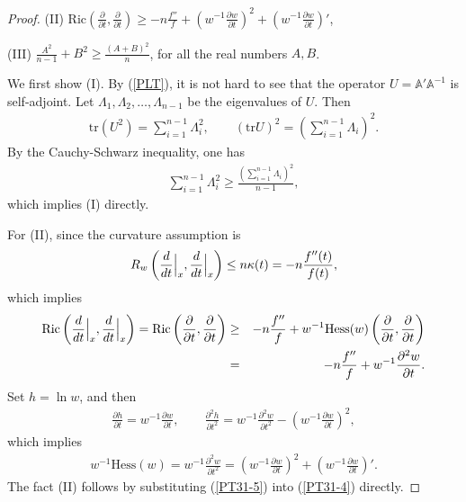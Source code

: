 \documentclass[12pt]{article}
\begin{document}
\begin{proof}
\vspace{2mm}

\noindent (II) $\mathrm{Ric}(\frac{\partial}{\partial
t},\frac{\partial}{\partial t})\geq
-n\frac{f''}{f}+(w^{-1}\frac{\partial w}{\partial
t})^{2}+(w^{-1}\frac{\partial w}{\partial t})'$,

\vspace{2mm}

\noindent (III) $\frac{A^{2}}{n-1}+B^{2}\geq\frac{(A+B)^{2}}{n}$,
for all the real numbers $A, B$.

\vspace{2mm}

We first show (I). By (\ref{PLT}), it is not hard to see that the
operator $U=\mathbb{A}'\mathbb{A}^{-1}$ is self-adjoint. Let
$\Lambda_1, \Lambda_2, \ldots, \Lambda_{n-1}$ be the eigenvalues of
$U$. Then
\begin{eqnarray*}
\mathrm{tr}(U^2) = \sum_{i=1}^{n-1} \Lambda_i^2, \qquad (\mathrm{tr}
U)^2 = \left( \sum_{i=1}^{n-1} \Lambda_i \right)^2.
\end{eqnarray*}
By the Cauchy-Schwarz inequality, one has
\begin{eqnarray*}
\sum_{i=1}^{n-1} \Lambda_i^2 \geq \frac{\left( \sum_{i=1}^{n-1}
\Lambda_i \right)^2}{n-1},
\end{eqnarray*}
which implies (I) directly.

For (II), since the curvature assumption is
\begin{eqnarray*}
R_{w}\left(\frac{d}{dt}\Big{|}_{x},\frac{d}{dt}\Big{|}_{x}\right)\leq
n\kappa(t)=-n\frac{f''(t)}{f(t)},
\end{eqnarray*}
which implies
 \begin{eqnarray} \label{PT31-4}
\mathrm{Ric}\left(\frac{d}{dt}\Big{|}_{x},\frac{d}{dt}\Big{|}_{x}\right)=\mathrm{Ric}\left(\frac{\partial}{\partial
t}, \frac{\partial}{\partial t}\right) &\geq& -n \frac{f''}{f} +
w^{-1} \mathrm{Hess}(w)\left(\frac{\partial}{\partial t},
\frac{\partial}{\partial t}\right)\nonumber\\
&=& -n \frac{f''}{f} + w^{-1}\frac{\partial^{2}w}{\partial t}.
 \end{eqnarray}
 Set $h=\ln w$, and then
 \begin{eqnarray*}
\frac{\partial h}{\partial t}=w^{-1}\frac{\partial w}{\partial t},
\qquad  \frac{\partial ^{2}h}{\partial
t^{2}}=w^{-1}\frac{\partial^{2}w}{\partial
t^{2}}-\left(w^{-1}\frac{\partial w}{\partial t}\right)^{2},
\end{eqnarray*}
which implies
 \begin{eqnarray} \label{PT31-5}
w^{-1}\mathrm{Hess}(w)=w^{-1}\frac{\partial^{2}w}{\partial
t^{2}}=\left(w^{-1}\frac{\partial w}{\partial
t}\right)^{2}+\left(w^{-1}\frac{\partial w}{\partial t}\right)'.
 \end{eqnarray}
The fact (II) follows by  substituting (\ref{PT31-5}) into
(\ref{PT31-4}) directly.


\end{proof}
\end{document}
